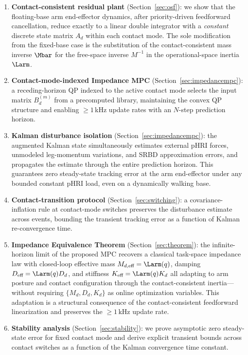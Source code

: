 \begin{enumerate}
\item \textbf{Contact-consistent residual plant} (Section~\ref{sec:osf}):
we show that the floating-base arm end-effector dynamics, after
priority-driven feedforward cancellation, reduce exactly to a linear double
integrator with a \emph{constant} discrete state matrix $A_d$ within each
contact mode. The sole modification from the fixed-base case is the
substitution of the contact-consistent mass inverse $\Mbar$ for the
free-space inverse $M^{-1}$ in the operational-space inertia $\Larm$.

\item \textbf{Contact-mode-indexed Impedance MPC}
(Section~\ref{sec:impedancempc}): a receding-horizon QP indexed to the
active contact mode selects the input matrix $B_d^{(m)}$ from a
precomputed library, maintaining the convex QP structure and enabling
${\geq}1$\,kHz update rates with an $N$-step prediction horizon.

\item \textbf{Kalman disturbance isolation}
(Section~\ref{sec:impedancempc}): the augmented Kalman state simultaneously
estimates external pHRI forces, unmodeled leg-momentum variations, and SRBD
approximation errors, and propagates the estimate through the entire
prediction horizon. This guarantees zero steady-state tracking error at the
arm end-effector under any bounded constant pHRI load, even on a
dynamically walking base.

\item \textbf{Contact-transition protocol} (Section~\ref{sec:switching}):
a covariance-inflation rule at contact-mode switches preserves the
disturbance estimate across events, bounding the transient tracking error
as a function of Kalman re-convergence time.

\item \textbf{Impedance Equivalence Theorem} (Section~\ref{sec:theorem}):
the infinite-horizon limit of the proposed MPC recovers a classical
task-space impedance law with closed-loop effective mass
$M_{d,\text{eff}}=\Larm(q)$, damping $D_{\text{eff}}=\Larm(q)D_d$, and
stiffness $K_{\text{eff}}=\Larm(q)K_d$ all adapting to arm posture and
contact configuration through the contact-consistent inertia---without
requiring $\{M_d,D_d,K_d\}$ as online optimization variables. This
adaptation is a structural consequence of the contact-consistent feedforward
linearization and preserves the ${\geq}1$\,kHz update rate.

\item \textbf{Stability analysis} (Section~\ref{sec:stability}): we prove
asymptotic zero steady-state error for fixed contact mode and derive
explicit transient bounds across contact switches as a function of the
Kalman convergence time constant.
\end{enumerate}

